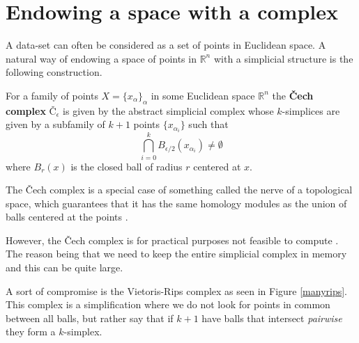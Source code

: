 \section{Endowing a space with a complex}
A data-set can often be considered as a set of points in Euclidean space. A natural way of endowing a space of points in $\mathbb{R}^{n}$ with a simplicial structure is the following construction.
\begin{definition}
For a family of points $X=\{x_{\alpha}\}_{\alpha}$ in some Euclidean space $\mathbb{R}^{n}$ the \textbf{Čech complex}
$Č_{\epsilon}$ is given by the abstract simplicial complex whose $k$-simplices are given by a subfamily of $k+1$ points $\{x_{\alpha_{i}}\}$ such that \[\bigcap^{k}_{i=0} B_{\epsilon/2}(x_{\alpha_{i}}) \neq \emptyset\] where $B_{r}(x)$ is the closed ball of radius $r$ centered at $x$.
\end{definition}
The Čech complex is a special case of something called the nerve of a topological space, which guarantees that it has the same homology modules as the union of balls centered at the points \cite[p. ~71]{edels}.

However, the Čech complex is for practical purposes not feasible to compute \cite{ghirst}. The reason being that we need to keep the entire simplicial complex in memory and this can be quite large.

A sort of compromise is the Vietoris-Rips complex as seen in Figure \ref{manyrips}. This complex is a simplification where we do not look for points in common between all balls, but rather say that if $k+1$ have balls that intersect \textit{pairwise} they form a $k$-simplex.

